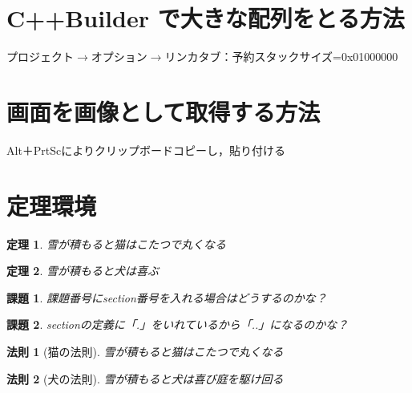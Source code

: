 \documentclass[a4paper,10pt]{jsarticle}
\begin{document}
\section{C++Builder で大きな配列をとる方法}
\begin{screen}
\centerline{プロジェクト$\rightarrow$オプション$\rightarrow$リンカタブ：予約スタックサイズ=0x01000000}
\end{screen}


\section{画面を画像として取得する方法}
\begin{screen}
\centerline{Alt＋PrtScによりクリップボードコピーし，貼り付ける}
\end{screen}



\section{定理環境}
\newtheorem{teiri}{定理}
\begin{teiri}
雪が積もると猫はこたつで丸くなる
\end{teiri}
\begin{teiri}
雪が積もると犬は喜ぶ
\end{teiri}

\newtheorem{kadai}{課題}[section]
\begin{kadai}
課題番号にsection番号を入れる場合はどうするのかな？
\end{kadai}
\begin{kadai}
sectionの定義に「.」をいれているから「..」になるのかな？
\end{kadai}

\newtheorem{teiri1}{法則}
\begin{teiri1}[猫の法則]
雪が積もると猫はこたつで丸くなる
\end{teiri1}
\begin{teiri1}[犬の法則]
雪が積もると犬は喜び庭を駆け回る
\end{teiri1}
\end{document}
